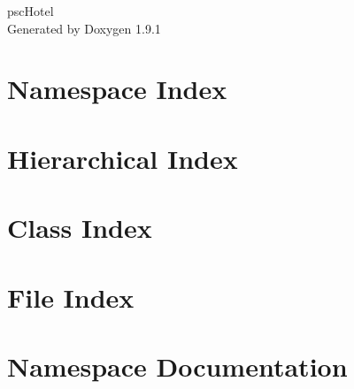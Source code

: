 \let\mypdfximage\pdfximage\def\pdfximage{\immediate\mypdfximage}\documentclass[twoside]{book}
\newcommand{\+}{\discretionary{\mbox{\scriptsize$\hookleftarrow$}}{}{}}
\newcommand{\clearemptydoublepage}{%
  \newpage{\pagestyle{empty}\cleardoublepage}%
}
\begin{document}
\raggedbottom

\begin{titlepage}
\vspace*{7cm}
\begin{center}%
{\Large psc\+Hotel }\\
\vspace*{1cm}
{\large Generated by Doxygen 1.9.1}\\
\end{center}
\end{titlepage}
\clearemptydoublepage
{}
\tableofcontents
\clearemptydoublepage
{}

\chapter{Namespace Index}

\chapter{Hierarchical Index}

\chapter{Class Index}

\chapter{File Index}

\chapter{Namespace Documentation}



\end{document}
